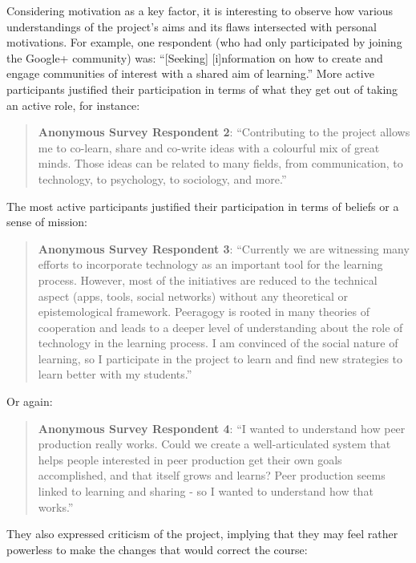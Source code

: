 Considering motivation as a key factor, it is interesting to observe how
various understandings of the project's aims and its flaws intersected
with personal motivations. For example, one respondent (who had only
participated by joining the Google+ community) was: ``{{[}Seeking{]}}
{{[}i{]}}nformation on how to create and engage communities of interest
with a shared aim of learning.'' More active participants justified
their participation in terms of what they get out of taking an active
role, for instance:

\begin{quote}
\textbf{Anonymous Survey Respondent 2}: ``Contributing to the project
allows me to co-learn, share and co-write ideas with a colourful mix of
great minds. Those ideas can be related to many fields, from
communication, to technology, to psychology, to sociology, and more.''
\end{quote}

The most active participants justified their participation in terms of
beliefs or a sense of mission:

\begin{quote}
\textbf{Anonymous Survey Respondent 3}: ``Currently we are witnessing
many efforts to incorporate technology as an important tool for the
learning process. However, most of the initiatives are reduced to the
technical aspect (apps, tools, social networks) without any theoretical
or epistemological framework. Peeragogy is rooted in many theories of
cooperation and leads to a deeper level of understanding about the role
of technology in the learning process. I am convinced of the social
nature of learning, so I participate in the project to learn and find
new strategies to learn better with my students.''
\end{quote}

Or again:

\begin{quote}
\textbf{Anonymous Survey Respondent 4}: ``I wanted to understand how
peer production really works. Could we create a well-articulated system
that helps people interested in peer production get their own goals
accomplished, and that itself grows and learns? Peer production seems
linked to learning and sharing - so I wanted to understand how that
works.''
\end{quote}

They also expressed criticism of the project, implying that they may
feel rather powerless to make the changes that would correct the course:

